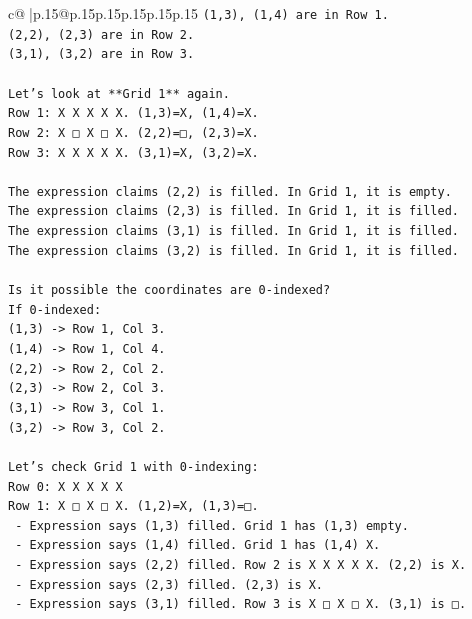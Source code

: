 \documentclass{article}
\begin{document}
{\begin{supertabular}{c@{$\;$}|p{.15\linewidth}@{}p{.15\linewidth}p{.15\linewidth}p{.15\linewidth}p{.15\linewidth}p{.15\linewidth}}
{{{\texttt{(1,3), (1,4) are in Row 1.} \\
\texttt{(2,2), (2,3) are in Row 2.} \\
\texttt{(3,1), (3,2) are in Row 3.} \\
\\ 
\texttt{Let's look at **Grid 1** again.} \\
\texttt{Row 1: X X X X X. (1,3)=X, (1,4)=X.} \\
\texttt{Row 2: X □ X □ X. (2,2)=□, (2,3)=X.} \\
\texttt{Row 3: X X X X X. (3,1)=X, (3,2)=X.} \\
\\ 
\texttt{The expression claims (2,2) is filled. In Grid 1, it is empty.} \\
\texttt{The expression claims (2,3) is filled. In Grid 1, it is filled.} \\
\texttt{The expression claims (3,1) is filled. In Grid 1, it is filled.} \\
\texttt{The expression claims (3,2) is filled. In Grid 1, it is filled.} \\
\\ 
\texttt{Is it possible the coordinates are 0{-}indexed?} \\
\texttt{If 0{-}indexed:} \\
\texttt{(1,3) {-}> Row 1, Col 3.} \\
\texttt{(1,4) {-}> Row 1, Col 4.} \\
\texttt{(2,2) {-}> Row 2, Col 2.} \\
\texttt{(2,3) {-}> Row 2, Col 3.} \\
\texttt{(3,1) {-}> Row 3, Col 1.} \\
\texttt{(3,2) {-}> Row 3, Col 2.} \\
\\ 
\texttt{Let's check Grid 1 with 0{-}indexing:} \\
\texttt{Row 0: X X X X X} \\
\texttt{Row 1: X □ X □ X. (1,2)=X, (1,3)=□.} \\
\texttt{   {-} Expression says (1,3) filled. Grid 1 has (1,3) empty.} \\
\texttt{   {-} Expression says (1,4) filled. Grid 1 has (1,4) X.} \\
\texttt{   {-} Expression says (2,2) filled. Row 2 is X X X X X. (2,2) is X.} \\
\texttt{   {-} Expression says (2,3) filled. (2,3) is X.} \\
\texttt{   {-} Expression says (3,1) filled. Row 3 is X □ X □ X. (3,1) is □.} \\
}}}
\end{supertabular}}
\end{document}

